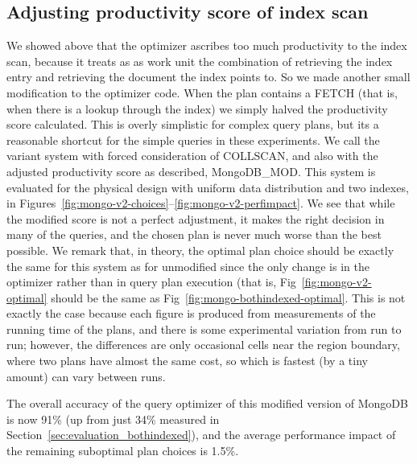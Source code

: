 \subsection{Adjusting productivity score of index scan}
We showed above that the optimizer ascribes too much productivity to the index scan, because it treats as as work unit the combination of retrieving the index entry and retrieving the document the index points to. So we made another small modification to the optimizer code. When the plan contains a FETCH (that is, when there is a lookup through the index) we simply halved the productivity score calculated. This is overly simplistic for complex query plans, but its a reasonable shortcut for the simple queries in these experiments. We call the variant system with forced consideration of COLLSCAN, and also with the adjusted productivity score as described, MongoDB\_MOD.  This system is evaluated for the physical design with uniform data distribution and two indexes, in Figures~\ref{fig:mongo-v2-choices}--\ref{fig:mongo-v2-perfimpact}. We see that while the modified score is not a perfect adjustment, it makes the right decision in many of the queries, and the chosen plan is never much worse than the best possible. We remark that, in theory, the optimal plan choice should be exactly the same for this system as for unmodified \relname since the only change is in the optimizer rather than in query plan execution (that is, Fig~\ref{fig:mongo-v2-optimal} should be the same as Fig~\ref{fig:mongo-bothindexed-optimal}. This is not exactly the case because each figure is produced from measurements of the running time of the plans, and there is some experimental variation from run to run; however, the differences are only occasional cells near the region boundary, where two plans have almost the same cost, so which is fastest (by a tiny amount) can vary between runs.


The overall accuracy of the query optimizer of this modified version of MongoDB is now 91\% (up from just 34\% measured in Section~\ref{sec:evaluation_bothindexed}), and the average performance impact of the remaining suboptimal plan choices is 1.5\%. 

